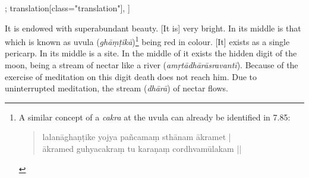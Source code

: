 \begin{alignment}[
    texts=edition[class="edition"];
    translation[class="translation"],
 ]
\begin{translation}
\begin{tlate}
It is endowed with superabundant beauty. [It is] very bright. In its middle is that which is known as uvula (\textit{ghāṃṭikā})\footnote{A similar concept of a \textit{cakra} at the uvula can already be identified in  7.85: \begin{quote}
    lalanāghaṇṭike yojya pañcamaṃ sthānam ākramet |\\
    ākramed guhyacakraṃ tu karaṇaṃ cordhvamūlakam ||
  \end{quote}} being red in colour. [It] exists as a single pericarp. In its middle is a site. In the middle of it exists the hidden digit of the moon, being a stream of nectar like a river (\textit{amṛtādhārāsravantī}). Because of the exercise of meditation on this digit death does not reach him. Due to uninterrupted meditation, the stream (\textit{dhārā}) of nectar flows. \vspace*{\fill} 
    \end{tlate}
  \end{translation}
  \ekdpb*{}
\end{alignment}
